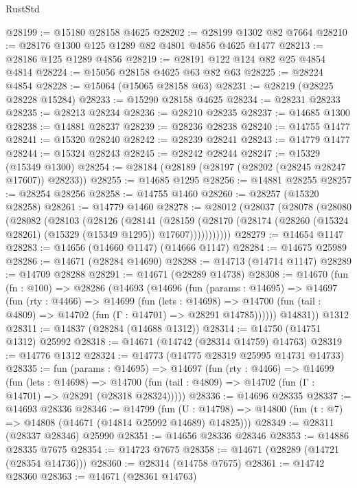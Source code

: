 \begin{lexlean}{RustStd}
\begin{coremodule}
@28199 := @15180 @28158 @4625
@28202 := @28199 @1302 @82 @7664
@28210 := @28176 @1300 @125 @1289 @82 @4801 @4856 @4625 @1477
@28213 := @28186 @125 @1289 @4856
@28219 := @28191 @122 @124 @82 @25 @4854 @4814
@28224 := @15056 @28158 @4625 @63 @82 @63
@28225 := @28224 @4854
@28228 := @15064 (@15065 @28158 @63)
@28231 := @28219 (@28225 @28228 @15284)
@28233 := @15290 @28158 @4625
@28234 := @28231 @28233
@28235 := @28213 @28234
@28236 := @28210 @28235
@28237 := @14685 @1300
@28238 := @14881 @28237
@28239 := @28236 @28238
@28240 := @14755 @1477
@28241 := @15320 @28240
@28242 := @28239 @28241
@28243 := @14779 @1477
@28244 := @15324 @28243
@28245 := @28242 @28244
@28247 := @15329 (@15349 @1300)
@28254 := @28184 (@28189 (@28197 (@28202 (@28245 @28247 @17607)) @28233))
@28255 := @14685 @1295
@28256 := @14881 @28255
@28257 := @28254 @28256
@28258 := @14755 @1460
@28260 := @28257 (@15320 @28258)
@28261 := @14779 @1460
@28278 := @28012
    (@28037
      (@28078
        (@28080
          (@28082
            (@28103
              (@28126
                (@28141
                  (@28159
                    (@28170
                      (@28174 (@28260 (@15324 @28261) (@15329 (@15349 @1295)) @17607)))))))))))
@28279 := @14654 @1147
@28283 := @14656 (@14660 @1147) (@14666 @1147)
@28284 := @14675 @25989
@28286 := @14671 (@28284 @14690)
@28288 := @14713 (@14714 @1147)
@28289 := @14709 @28288
@28291 := @14671 (@28289 @14738)
@28308 := @14670
    (fun (fn : @100) =>
    @28286
      (@14693
        (@14696
          (fun (params : @14695) =>
          @14697
            (fun (rty : @4466) =>
            @14699
              (fun (lets : @14698) =>
              @14700 (fun (tail : @4809) => @14702 (fun (Γ : @14701) => @28291 @14785))))))
        @14831))
    @1312
@28311 := @14837 (@28284 (@14688 @1312))
@28314 := @14750 (@14751 @1312) @25992
@28318 := @14671 (@14742 (@28314 @14759) @14763)
@28319 := @14776 @1312
@28324 := @14773 (@14775 @28319 @25995 @14731 @14733)
@28335 := fun (params : @14695) =>
  @14697
    (fun (rty : @4466) =>
    @14699
      (fun (lets : @14698) =>
      @14700 (fun (tail : @4809) => @14702 (fun (Γ : @14701) => @28291 (@28318 @28324)))))
@28336 := @14696 @28335
@28337 := @14693 @28336
@28346 := @14799
    (fun (U : @14798) => @14800 (fun (t : @7) => @14808 (@14671 (@14814 @25992 @14689) @14825)))
@28349 := @28311 (@28337 @28346) @25990
@28351 := @14656 @28336 @28346
@28353 := @14886 @28335 @7675
@28354 := @14723 @7675
@28358 := @14671 (@28289 (@14721 (@28354 @14736)))
@28360 := @28314 (@14758 @7675)
@28361 := @14742 @28360
@28363 := @14671 (@28361 @14763)

\end{coremodule}
\end{lexlean}
